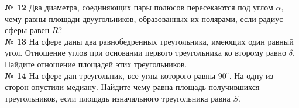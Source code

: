     \textbf{№ 12}
    Два диаметра, соединяющих пары полюсов пересекаются под углом $\alpha$,
    чему равны площади двуугольников, образованных их полярами, если радиус сферы равен $R$?\\


    \textbf{№ 13}
    На сфере даны два равнобедренных треугольника, имеющих один равный угол.
    Отношение углов при основании первого треугольника ко второму равно $\delta$.
    Найдите отношение площадей этих треугольников.\\


    \textbf{№ 14}
    На сфере дан треугольник, все углы которого равны $90^\circ$.
    На одну из сторон опустили медиану.
    Найдите чему равна площадь получившихся треугольников, если площадь изначального треугольника равна $S$.

